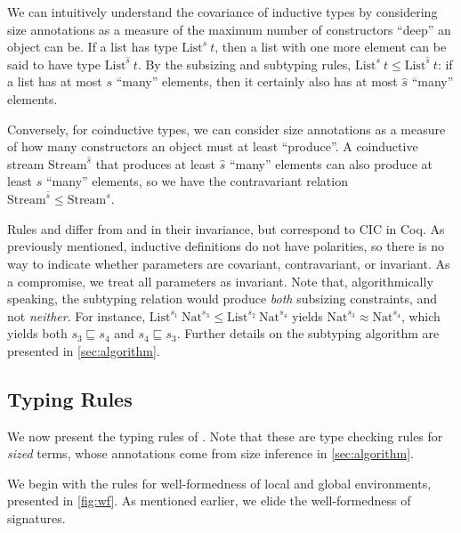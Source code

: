 We can intuitively understand the covariance of inductive types by considering size annotations as a measure of the maximum number of constructors ``deep'' an object can be.
If a list has type $\text{List}^s ~ t$, then a list with one more element can be said to have type $\text{List}^{\hat{s}} ~ t$.
By the subsizing and subtyping rules, $\text{List}^s ~ t \leq \text{List}^{\hat{s}} ~ t$: if a list has at most $s$ ``many'' elements, then it certainly also has at most $\hat{s}$ ``many'' elements.

Conversely, for coinductive types, we can consider size annotations as a measure of how many constructors an object must at least ``produce''. A coinductive stream $\text{Stream}^{\hat{s}}$ that produces at least $\hat{s}$ ``many'' elements can also produce at least $s$ ``many'' elements, so we have the contravariant relation $\text{Stream}^{\hat{s}} \leq \text{Stream}^s$.

Rules  and  differ from \CIChat and \CIChatminus in their invariance, but correspond to CIC in Coq.
As previously mentioned, inductive definitions do not have polarities, so there is no way to indicate whether parameters are covariant, contravariant, or invariant.
As a compromise, we treat all parameters as invariant.
Note that, algorithmically speaking, the subtyping relation would produce \textit{both} subsizing constraints, and not \textit{neither}. For instance, $\text{List}^{s_1} ~ \text{Nat}^{s_3} \leq \text{List}^{s_2} ~ \text{Nat}^{s_4}$ yields $\text{Nat}^{s_3} \approx \text{Nat}^{s_4}$, which yields both $s_3 \sqsubseteq s_4$ and $s_4 \sqsubseteq s_3$.
Further details on the subtyping algorithm are presented in \autoref{sec:algorithm}.

\subsection{Typing Rules}

We now present the typing rules of \lang.
Note that these are type checking rules for \textit{sized} terms, whose annotations come from size inference in \autoref{sec:algorithm}.



We begin with the rules for well-formedness of local and global environments, presented in \autoref{fig:wf}.
As mentioned earlier, we elide the well-formedness of signatures.



